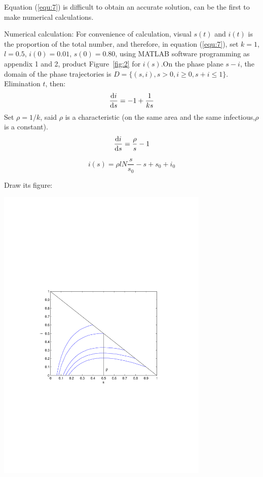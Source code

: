Equation (\ref{equ:7}) is difficult to obtain an accurate
solution, can be the first to make numerical calculations.
\par Numerical calculation: For convenience of calculation, visual
$ s(t) $ and $ i(t) $ is the proportion of the total number,
and therefore, in equation (\ref{equ:7}), set $k=1$,
$l=0.5$, $i(0)=0.01$, $s(0)=0.80$, using MATLAB software
programming as appendix 1 and 2, product Figure~\ref{fig:2} for
$i(s)$.On the phase plane $s-i$, the domain of the phase
trajectories is $ D=\{(s,i),s>0,i\geq 0,s+i\leq1\} $.\\
Elimination $ t $, then:
\begin{equation}
\frac{{\mathrm{d}}i}{{\mathrm{d}}s}=-1+\frac{1}{ks}
\label{equ:8}
\end{equation}
Set $\rho=1/k$, said $\rho$ is a characteristic (on the
same area and the same infectious,$\rho$ is a constant).
\begin{equation}
\frac{{\mathrm{d}}i}{{\mathrm{d}}s}=\frac{\rho}{s}-1
\label{equ:9}
\end{equation}

\begin{equation}
i(s)=\rho lN\frac{s}{s_0}-s+s_0+i_0
\label{equ:10}
\end{equation}

Draw its figure:\par
\begin{center}
\includegraphics[width=4in]{imgs/i(s)_i_s.pdf}
\end{center}

